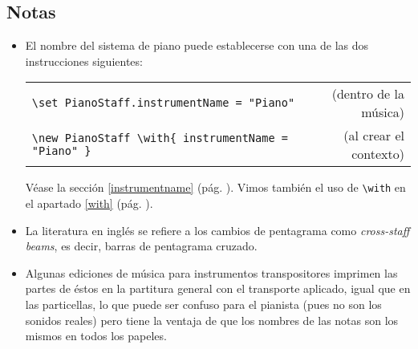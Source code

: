 \subsection{Notas}
\begin{itemize}
\item El nombre del sistema de piano puede establecerse con una de
  las dos instrucciones siguientes:

\begin{tabular}{l     r}
\verb+\set PianoStaff.instrumentName = "Piano"+ & (dentro de la música) \\
\verb+\new PianoStaff \with{ instrumentName = "Piano" }+ & (al crear el contexto)
\end{tabular}

\medskip

Véase la sección \ref{instrumentname}
(pág. \pageref{instrumentname}).  Vimos también el uso de
\verb+\with+ en el apartado \ref{with} (pág. \pageref{with}).

\item La literatura en inglés se refiere a los cambios de
  pentagrama como \emph{cross-staff beams}, es decir, barras de
  pentagrama cruzado.

\item Algunas ediciones de música para instrumentos transpositores
  imprimen las partes de éstos en la partitura general con el
  transporte aplicado, igual que en las particellas, lo que puede
  ser confuso para el pianista (pues no son los sonidos reales)
  pero tiene la ventaja de que los nombres de las notas son los
  mismos en todos los papeles.
\end{itemize}
